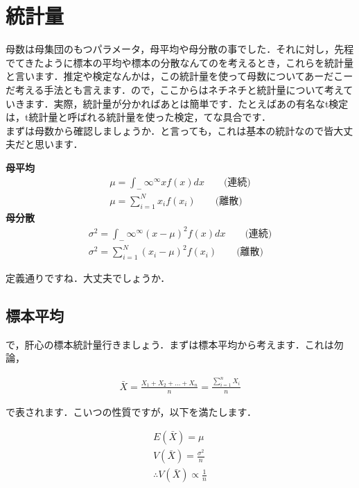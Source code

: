 \documentclass[11pt,a4paper,uplatex]{ujreport} 	%
\begin{document}
\section{統計量}
母数は母集団のもつパラメータ，母平均や母分散の事でした．それに対し，先程でてきたように標本の平均や標本の分散なんてのを考えるとき，これらを統計量と言います．推定や検定なんかは，この統計量を使って母数についてあーだこーだ考える手法とも言えます．ので，ここからはネチネチと統計量について考えていきます．実際，統計量が分かればあとは簡単です．たとえばあの有名なt検定は，t統計量と呼ばれる統計量を使った検定，てな具合です．\\

まずは母数から確認しましょうか．と言っても，これは基本の統計なので皆大丈夫だと思います．

\begin{screen}
  \textbf{母平均}
  \begin{align}
    \mu = \int_-\infty^\infty x f(x) dx \qquad \text{(連続)}\\
    \mu = \sum_{i=1}^N x_i f(x_i) \qquad \text{(離散)}
  \end{align}  
  \textbf{母分散}
  \begin{align}
    \sigma^2 = \int_-\infty^\infty (x-\mu)^2f(x)dx \qquad \text{(連続)}\\
    \sigma^2 = \sum_{i=1}^N (x_i-\mu)^2 f(x_i) \qquad \text{(離散)}
  \end{align}
\end{screen}

定義通りですね．大丈夫でしょうか．\\

\subsection{標本平均}
で，肝心の標本統計量行きましょう．まずは標本平均から考えます．これは勿論，

\begin{align}
  \bar{X} = \frac{X_1 + X_2+...+X_n}{n} = \frac{\sum_{i=1}^n X_i}{n}
\end{align}

で表されます．こいつの性質ですが，以下を満たします．

\begin{align}
  E(\bar{X}) = \mu
  \label{eq:ave}\\
  V(\bar{X}) = \frac{\sigma^2}{n}\\
  \therefore V(\bar{X}) \propto \frac{1}{n}
  \label{eq:var}
\end{align}
  
\end{document}
